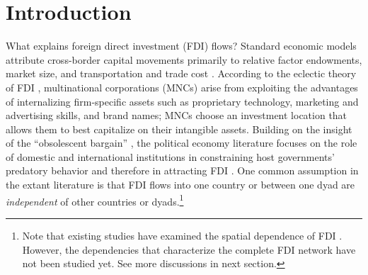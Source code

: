 \documentclass[reqno,onecolumn,letterpaper,12pt]{article}
\begin{document}

\sloppy
\clearpage
\doublespacing
\setcounter{page}{1}
\section{Introduction}


What explains foreign direct investment (FDI) flows? Standard economic models attribute cross-border capital movements primarily to relative factor endowments, market size, and transportation and trade cost \citep{Helpman:1984,Carr_et_al:2001}.
According to the eclectic theory of FDI \citep{Dunning:1988,Dunning:1992}, multinational corporations (MNCs) arise from exploiting the advantages of internalizing firm-specific assets such as proprietary technology, marketing and advertising skills, and brand names; MNCs choose an investment location that allows them to best capitalize on their intangible assets. Building on the insight of the ``obsolescent bargain'' \citep{Vernon:1971,Vernon:1980}, the political economy literature focuses on the role of domestic and international institutions in constraining host governments' predatory behavior and therefore in attracting FDI \citep[e.g.,][]{Jensen:2003,Jensen:2006,Li_Resnick:2003,Staats_Biglaiser:2012,Buthe_Milner:2008,Allee_Peinhardt:2011,Kerner:2009}. One common assumption in the extant literature is that FDI flows into one country or between one dyad are \emph{independent} of other countries or dyads.\footnote{Note that existing studies have examined the spatial dependence of FDI \citep[e.g.,][]{coughlin2000foreign,blanco2012spatial,blonigen2007fdi}. However, the dependencies that characterize the complete FDI network have not been studied yet. See more discussions in next section. }
\end{document}
